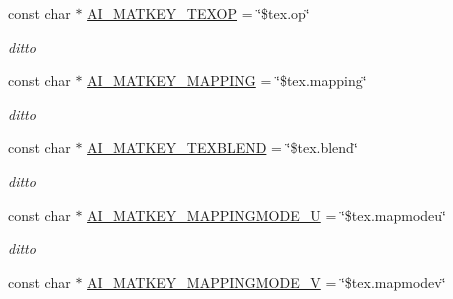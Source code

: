 \begin{DoxyCompactItemize}
\item 
\hypertarget{namespaceassimp_1_1material_a95d978ceb90c1951a17711536bcfddd5}{const char $\ast$ \hyperlink{namespaceassimp_1_1material_a95d978ceb90c1951a17711536bcfddd5}{A\+I\+\_\+\+M\+A\+T\+K\+E\+Y\+\_\+\+T\+E\+X\+O\+P} = \char`\"{}\$tex.\+op\char`\"{}}\label{namespaceassimp_1_1material_a95d978ceb90c1951a17711536bcfddd5}

\begin{DoxyCompactList}\small\item\em ditto \end{DoxyCompactList}\item 
\hypertarget{namespaceassimp_1_1material_a4d2c3f763c92ab5b68c74fb5e9ec849b}{const char $\ast$ \hyperlink{namespaceassimp_1_1material_a4d2c3f763c92ab5b68c74fb5e9ec849b}{A\+I\+\_\+\+M\+A\+T\+K\+E\+Y\+\_\+\+M\+A\+P\+P\+I\+N\+G} = \char`\"{}\$tex.\+mapping\char`\"{}}\label{namespaceassimp_1_1material_a4d2c3f763c92ab5b68c74fb5e9ec849b}

\begin{DoxyCompactList}\small\item\em ditto \end{DoxyCompactList}\item 
\hypertarget{namespaceassimp_1_1material_a5f912828dfa7dabf473deb5290586e07}{const char $\ast$ \hyperlink{namespaceassimp_1_1material_a5f912828dfa7dabf473deb5290586e07}{A\+I\+\_\+\+M\+A\+T\+K\+E\+Y\+\_\+\+T\+E\+X\+B\+L\+E\+N\+D} = \char`\"{}\$tex.\+blend\char`\"{}}\label{namespaceassimp_1_1material_a5f912828dfa7dabf473deb5290586e07}

\begin{DoxyCompactList}\small\item\em ditto \end{DoxyCompactList}\item 
\hypertarget{namespaceassimp_1_1material_a56291129e8f9b5f328dc23887f018ff8}{const char $\ast$ \hyperlink{namespaceassimp_1_1material_a56291129e8f9b5f328dc23887f018ff8}{A\+I\+\_\+\+M\+A\+T\+K\+E\+Y\+\_\+\+M\+A\+P\+P\+I\+N\+G\+M\+O\+D\+E\+\_\+\+U} = \char`\"{}\$tex.\+mapmodeu\char`\"{}}\label{namespaceassimp_1_1material_a56291129e8f9b5f328dc23887f018ff8}

\begin{DoxyCompactList}\small\item\em ditto \end{DoxyCompactList}\item 
\hypertarget{namespaceassimp_1_1material_a7fc185a6d4e680c1404a5f77ac8422d3}{const char $\ast$ \hyperlink{namespaceassimp_1_1material_a7fc185a6d4e680c1404a5f77ac8422d3}{A\+I\+\_\+\+M\+A\+T\+K\+E\+Y\+\_\+\+M\+A\+P\+P\+I\+N\+G\+M\+O\+D\+E\+\_\+\+V} = \char`\"{}\$tex.\+mapmodev\char`\"{}}\label{namespaceassimp_1_1material_a7fc185a6d4e680c1404a5f77ac8422d3}


\end{DoxyCompactItemize}
